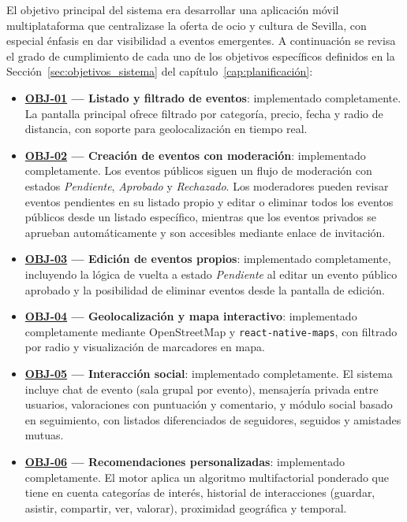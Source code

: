 El objetivo principal del sistema era desarrollar una aplicación móvil multiplataforma que centralizase la oferta de ocio y cultura de Sevilla, con especial énfasis en dar visibilidad a eventos emergentes. A continuación se revisa el grado de cumplimiento de cada uno de los objetivos específicos definidos en la Sección~\ref{sec:objetivos_sistema} del capítulo~\ref{cap:planificación}:

\begin{itemize}
    \item \textbf{\hyperref[obj:01]{OBJ-01} --- Listado y filtrado de eventos}: implementado completamente. La pantalla principal ofrece filtrado por categoría, precio, fecha y radio de distancia, con soporte para geolocalización en tiempo real.

    \item \textbf{\hyperref[obj:02]{OBJ-02} --- Creación de eventos con moderación}: implementado completamente. Los eventos públicos siguen un flujo de moderación con estados \textit{Pendiente}, \textit{Aprobado} y \textit{Rechazado}. Los moderadores pueden revisar eventos pendientes en su listado propio y editar o eliminar todos los eventos públicos desde un listado específico, mientras que los eventos privados se aprueban automáticamente y son accesibles mediante enlace de invitación.

    \item \textbf{\hyperref[obj:03]{OBJ-03} --- Edición de eventos propios}: implementado completamente, incluyendo la lógica de vuelta a estado \textit{Pendiente} al editar un evento público aprobado y la posibilidad de eliminar eventos desde la pantalla de edición.

    \item \textbf{\hyperref[obj:04]{OBJ-04} --- Geolocalización y mapa interactivo}: implementado completamente mediante OpenStreetMap y \texttt{react-native-maps}, con filtrado por radio y visualización de marcadores en mapa.

    \item \textbf{\hyperref[obj:05]{OBJ-05} --- Interacción social}: implementado completamente. El sistema incluye chat de evento (sala grupal por evento), mensajería privada entre usuarios, valoraciones con puntuación y comentario, y módulo social basado en seguimiento, con listados diferenciados de seguidores, seguidos y amistades mutuas.

    \item \textbf{\hyperref[obj:06]{OBJ-06} --- Recomendaciones personalizadas}: implementado completamente. El motor aplica un algoritmo multifactorial ponderado que tiene en cuenta categorías de interés, historial de interacciones (guardar, asistir, compartir, ver, valorar), proximidad geográfica y temporal.


\end{itemize}
